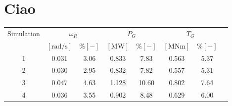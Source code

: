 \documentclass[11pt, a4paper]{article}
\begin{document}
\section{Ciao}
\begin{table}[htb]
  \centering
  \begin{tabular}{cccccccc}
  \toprule
    Simulation & \multicolumn{2}{c}{$\omega_R$} & \multicolumn{2}{c}{$P_G$} & \multicolumn{2}{c}{$T_G$} \\ 
     & $\left[\si{\radian\per\second}\right]$ & $ \% \left[-\right]$ & $\left[\si{\mega\watt}\right]$ & $ \% \left[-\right]$ & $\left[\si{\mega\newton\meter} \right]$ & $ \% \left[-\right]$ \\ \midrule       
     1 & 0.031 & 3.06 & 0.833 & 7.83  & 0.563 & 5.37\\
     2 & 0.030 & 2.95 & 0.832 & 7.82  & 0.557 & 5.31\\
     3 & 0.047 & 4.63 & 1.128 & 10.60 & 0.802 & 7.64\\
     4 & 0.036 & 3.55 & 0.902 & 8.48  & 0.629 & 6.00\\
     \bottomrule
  \end{tabular}
  \label{tab:res_variable_gains}
\end{table}
\end{document}
